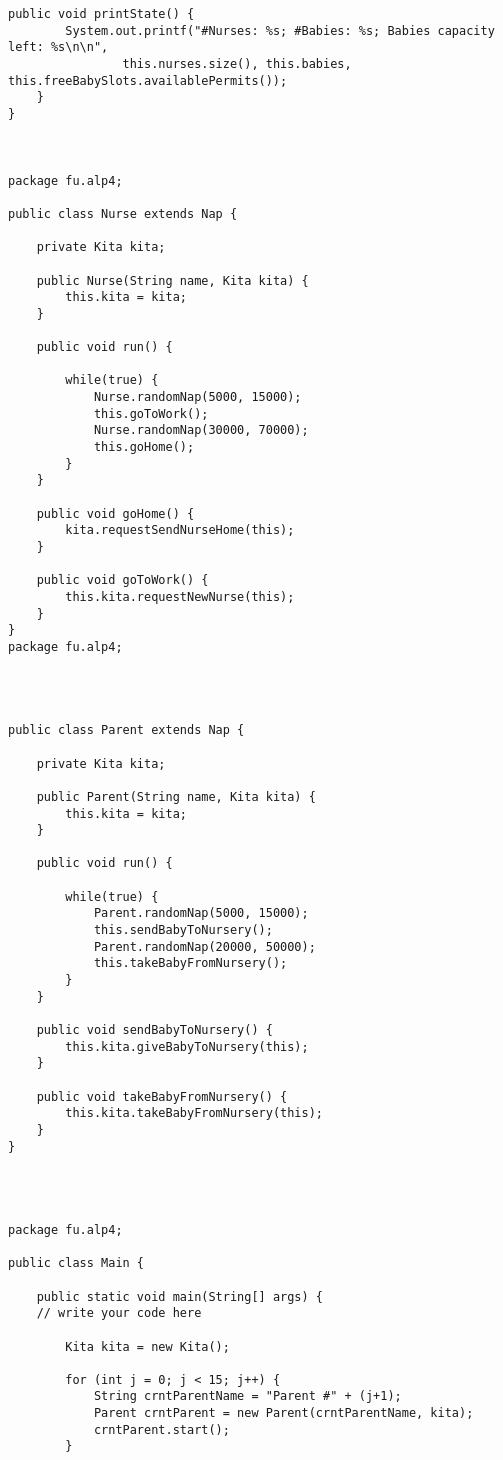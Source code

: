\begin{lstlisting}[style=java]
    public void printState() {
        System.out.printf("#Nurses: %s; #Babies: %s; Babies capacity left: %s\n\n",
                this.nurses.size(), this.babies, this.freeBabySlots.availablePermits());
    }
}



package fu.alp4;

public class Nurse extends Nap {

    private Kita kita;

    public Nurse(String name, Kita kita) {
        this.kita = kita;
    }

    public void run() {

        while(true) {
            Nurse.randomNap(5000, 15000);
            this.goToWork();
            Nurse.randomNap(30000, 70000);
            this.goHome();
        }
    }

    public void goHome() {
        kita.requestSendNurseHome(this);
    }

    public void goToWork() {
        this.kita.requestNewNurse(this);
    }
}
package fu.alp4;




public class Parent extends Nap {

    private Kita kita;

    public Parent(String name, Kita kita) {
        this.kita = kita;
    }

    public void run() {

        while(true) {
            Parent.randomNap(5000, 15000);
            this.sendBabyToNursery();
            Parent.randomNap(20000, 50000);
            this.takeBabyFromNursery();
        }
    }

    public void sendBabyToNursery() {
        this.kita.giveBabyToNursery(this);
    }

    public void takeBabyFromNursery() {
        this.kita.takeBabyFromNursery(this);
    }
}




package fu.alp4;

public class Main {

    public static void main(String[] args) {
    // write your code here

        Kita kita = new Kita();

        for (int j = 0; j < 15; j++) {
            String crntParentName = "Parent #" + (j+1);
            Parent crntParent = new Parent(crntParentName, kita);
            crntParent.start();
        }


\end{lstlisting}
